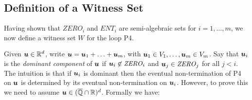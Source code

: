 \subsection{Definition of a Witness Set}
Having shown that $\mathit{ZERO}_i$ and $\mathit{ENT}_i$ are
semi-algebraic sets for $i=1,\ldots,m$, we now define a witness set
$W$ for the loop \textsf{P4}.

Given $\boldsymbol{u} \in \mathbb{R}^d$, write $\boldsymbol{u}=
\boldsymbol{u}_1+\ldots+\boldsymbol{u}_m$, with $\boldsymbol{u}_1 \in
V_1,\ldots,\boldsymbol{u}_m\in V_m$.  Say that $\boldsymbol{u}_i$ is
the \emph{dominant component} of $\boldsymbol{u}$ if
$\boldsymbol{u}_i\not\in \mathit{ZERO}_i$ and
$\boldsymbol{u}_j\in\mathit{ZERO}_j$ for all $j<i$.  The intuition is
that if $\boldsymbol{u}_i$ is dominant then the eventual
non-termination of \textsf{P4} on $\boldsymbol{u}$ is determined by
its eventual non-termination on $\boldsymbol{u}_i$.  However, to prove
this we need to assume $\boldsymbol{u}\in (\overline{\mathbb{Q}}\cap\mathbb{R})^d$.  Formally we
have:

